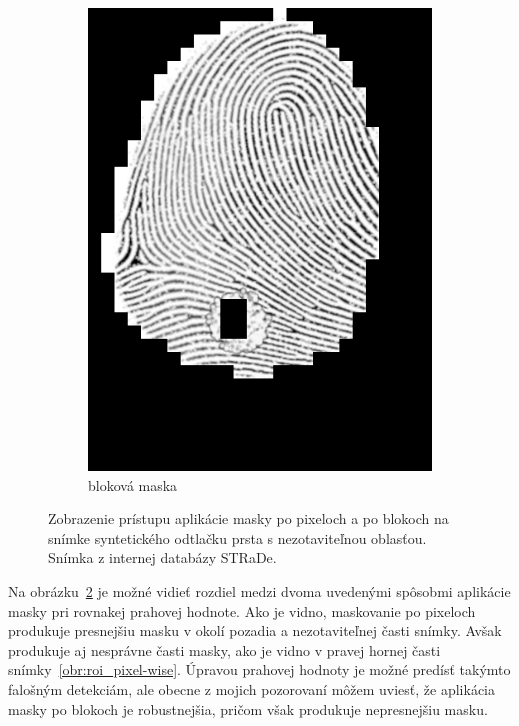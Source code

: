 \begin{figure}[h]
\begin{subfigure}[b]{0.3\linewidth}
      \includegraphics[width=\linewidth]{obrazky-figures/roi_block-wise.png}
      \caption{bloková maska}
      \label{obr:roi_block-wise}
    \end{subfigure}
    \caption{Zobrazenie prístupu aplikácie masky po pixeloch a po blokoch na snímke syntetického odtlačku prsta s nezotaviteľnou oblasťou.
            Snímka z internej databázy STRaDe.}
    \label{obr:typy_roi_masiek}
  \end{figure}

  Na obrázku~{\ref{obr:typy_roi_masiek}} je možné vidieť rozdiel medzi dvoma uvedenými spôsobmi aplikácie masky pri rovnakej prahovej hodnote.
  Ako je vidno, maskovanie po pixeloch produkuje presnejšiu masku v okolí pozadia a nezotaviteľnej časti snímky. Avšak produkuje aj nesprávne časti masky,
  ako je vidno v pravej hornej časti snímky~{\ref{obr:roi_pixel-wise}}. Úpravou prahovej hodnoty je možné predísť takýmto falošným detekciám, ale obecne z mojich
  pozorovaní môžem uviesť, že aplikácia masky po blokoch je robustnejšia, pričom však produkuje nepresnejšiu masku.
  
